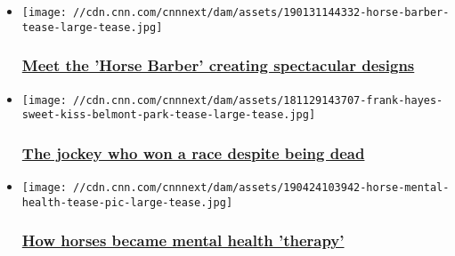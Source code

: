 \begin{itemize}
\item
  \href{/2019/02/12/sport/horse-barber-clipping-art-winning-post-spt-intl/index.html}{}

  \texttt{[image: //cdn.cnn.com/cnnnext/dam/assets/190131144332-horse-barber-tease-large-tease.jpg]}

  \hypertarget{meet-the-horse-barber-creating-spectacular-designs-}{%
  \subsubsection{\texorpdfstring{\href{/2019/02/12/sport/horse-barber-clipping-art-winning-post-spt-intl/index.html}{Meet
  the 'Horse Barber' creating spectacular designs
  }}{Meet the 'Horse Barber' creating spectacular designs }}\label{meet-the-horse-barber-creating-spectacular-designs-}}
\end{itemize}

\begin{itemize}
\item
  \href{/2018/12/10/sport/frank-hayes-sweet-kiss-belmont-park-intl-spt/index.html}{}

  \texttt{[image: //cdn.cnn.com/cnnnext/dam/assets/181129143707-frank-hayes-sweet-kiss-belmont-park-tease-large-tease.jpg]}

  \hypertarget{the-jockey-who-won-a-race-despite-being-dead}{%
  \subsubsection{\texorpdfstring{\href{/2018/12/10/sport/frank-hayes-sweet-kiss-belmont-park-intl-spt/index.html}{The
  jockey who won a race despite being
  dead}}{The jockey who won a race despite being dead}}\label{the-jockey-who-won-a-race-despite-being-dead}}
\end{itemize}

\begin{itemize}
\item
  \href{/2019/04/24/sport/mental-health-horse-racing-altior-therapy-winning-post-spt-intl/index.html}{}

  \texttt{[image: //cdn.cnn.com/cnnnext/dam/assets/190424103942-horse-mental-health-tease-pic-large-tease.jpg]}

  \hypertarget{how-horses-became-mental-health-therapy}{%
  \subsubsection{\texorpdfstring{\href{/2019/04/24/sport/mental-health-horse-racing-altior-therapy-winning-post-spt-intl/index.html}{How
  horses became mental health
  'therapy'}}{How horses became mental health 'therapy'}}\label{how-horses-became-mental-health-therapy}}
\end{itemize}

